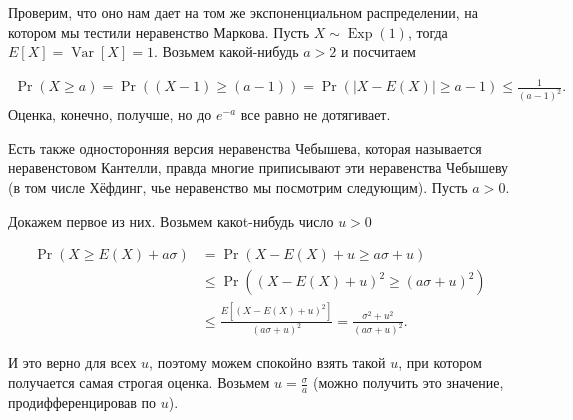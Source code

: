 \documentclass[12pt]{article}
\DeclareMathOperator{\Exp}{Exp}
\DeclareMathOperator{\Var}{Var}
\begin{document}
Проверим, что оно нам дает на том же экспоненциальном распределении, на котором мы тестили неравенство Маркова. Пусть $X \sim \Exp(1)$, тогда $E[X] = \Var[X] = 1$. Возьмем какой-нибудь $a > 2$ и посчитаем

\begin{align*}
  \Pr(X \ge a) = \Pr((X - 1) \ge (a - 1)) = \Pr(|X - E(X)| \ge a - 1) \le \frac{1}{(a - 1)^2}.
\end{align*}
Оценка, конечно, получше, но до $e^{-a}$ все равно не дотягивает.

Есть также односторонняя версия неравенства Чебышева, которая называется неравенстовом Кантелли, правда многие приписывают эти неравенства Чебышеву (в том числе Хёфдинг, чье неравенство мы посмотрим следующим). Пусть $a > 0$.


\begin{center}
\end{center}
\begin{center}
\end{center}

Докажем первое из них. Возьмем какоt-нибудь число $u > 0$

\begin{align*}
  \Pr(X \ge E(X) + a\sigma) &= \Pr(X - E(X) + u \ge a\sigma + u) \\
      &\le \Pr((X - E(X) + u)^2 \ge (a\sigma + u)^2) \\
      &\le \frac{E[(X - E(X) + u)^2]}{(a\sigma + u)^2} = \frac{\sigma^2+ u^2}{(a\sigma + u)^2}.
\end{align*}

И это верно для всех $u$, поэтому можем спокойно взять такой $u$, при котором получается самая строгая оценка. Возьмем $u = \frac{\sigma}{a}$ (можно получить это значение, продифференцировав по $u$).
\end{document}
